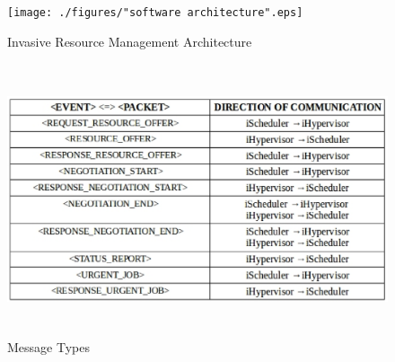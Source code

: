 \begin{figure}[!htbp]
\centering
\texttt{[image: ./figures/"software architecture".eps]}
\caption{Invasive Resource Management Architecture}
\label{fig:7}
\end{figure}
\begin{figure}[h]
\centering
\includegraphics[width=1.0\textwidth, height=80mm]{./figures/table.eps}
\caption{Message Types}
\label{fig:8}
\end{figure}

